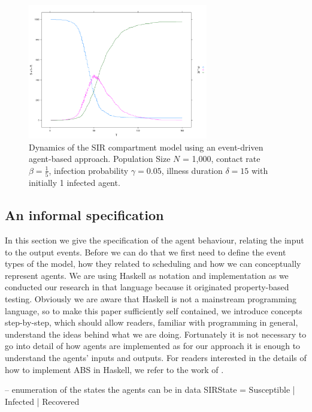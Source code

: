 \begin{figure}
	\centering
	\includegraphics[width=0.7\textwidth, angle=0]{./fig/sir_eventdriven.png}
	\caption{Dynamics of the SIR compartment model using an event-driven agent-based approach. Population Size $N$ = 1,000, contact rate $\beta =  \frac{1}{5}$, infection probability $\gamma = 0.05$, illness duration $\delta = 15$ with initially 1 infected agent.}
	\label{fig:sir_sd_dynamics}
\end{figure}

\subsection{An informal specification}
In this section we give the specification of the agent behaviour, relating the input to the output events. Before we can do that we first need to define the event types of the model, how they related to scheduling and how we can conceptually represent agents. We are using Haskell as notation and implementation as we conducted our research in that language because it originated property-based testing. Obviously we are aware that Haskell is not a mainstream programming language, so to make this paper sufficiently self contained, we introduce concepts step-by-step, which should allow readers, familiar with programming in general, understand the ideas behind what we are doing. Fortunately it is not necessary to go into detail of how agents are implemented as for our approach it is enough to understand the agents' inputs and outputs. For readers interested in the details of how to implement ABS in Haskell, we refer to the work of \cite{thaler_pure_2018}. 

\begin{HaskellCode}
-- enumeration of the states the agents can be in
data SIRState = Susceptible | Infected | Recovered
\end{HaskellCode}

